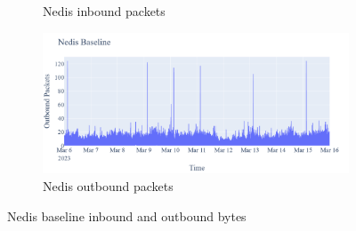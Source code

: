 \begin{figure}[H]
\begin{subfigure}[b]{0.4\textwidth}
        \caption{Nedis inbound packets}
    \end{subfigure}
    \begin{subfigure}[b]{0.4\textwidth}
        \includegraphics[width=\textwidth]{figures/Nedis_Baseline_OutboundPackets.png}
        \caption{Nedis outbound packets}
    \end{subfigure}
    \caption{Nedis baseline inbound and outbound bytes}
    \label{Fig:NedisBaselineOutandInboundTraffic}
 \end{figure}
 

